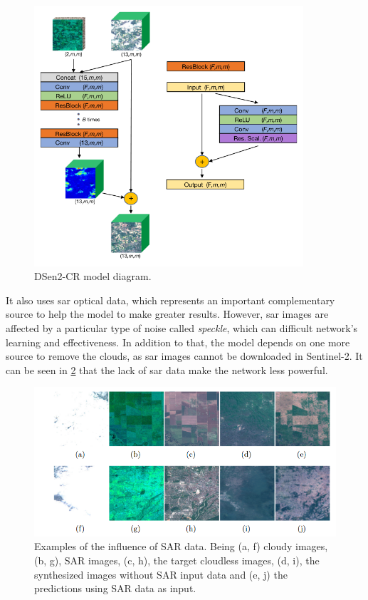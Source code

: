 \documentclass[../main.tex]{subfiles}
\begin{document}
\begin{figure}[H]
	\centering
	\includegraphics[width=10cm]{imgs/relatedwork/sar.png}
	\caption{DSen2-CR model diagram.}
	\label{fig:related-dsen2-cr}
\end{figure}
It also uses
\gls{sar} 
optical data, which represents an important complementary source to help the model to make greater results. However, \gls{sar} images are affected by a particular type of noise called \textit{speckle}, which can difficult network's learning and effectiveness. In addition to that, the model depends on one more source to remove the clouds, as \gls{sar} images cannot be downloaded in Sentinel-2. It can be seen in \ref{fig:related-dsen2-cr-predictions} that the lack of \gls{sar} data make the network less powerful. 
\begin{figure}[H]
	\centering
	\includegraphics[width=13cm]{imgs/relatedwork/dsen2-cr-predictions.png}
	\caption{Examples of the influence of SAR data. Being (a, f) cloudy images, (b, g), SAR images, (c, h), the target cloudless images, (d, i), the synthesized images without SAR input data and (e, j) the predictions using SAR data as input.}
	\label{fig:related-dsen2-cr-predictions}
\end{figure}
\end{document}
